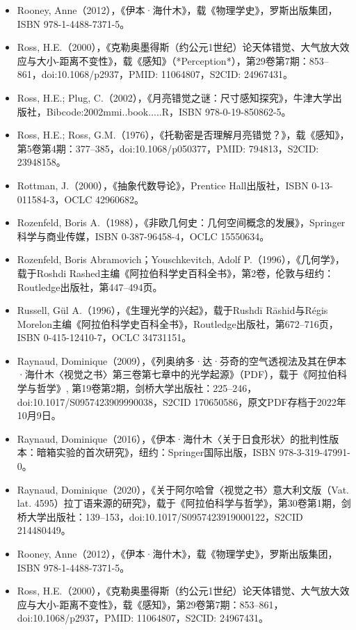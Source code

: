 \begin{itemize}
\item Rooney, Anne（2012），《伊本·海什木》，载《物理学史》，罗斯出版集团，ISBN 978-1-4488-7371-5。
\item Ross, H.E.（2000），《克勒奥墨得斯（约公元1世纪）论天体错觉、大气放大效应与大小-距离不变性》，载《感知》（*Perception*），第29卷第7期：853–861，doi:10.1068/p2937，PMID: 11064807，S2CID: 24967431。
\item Ross, H.E.; Plug, C.（2002），《月亮错觉之谜：尺寸感知探究》，牛津大学出版社，Bibcode:2002mmi..book.....R，ISBN 978-0-19-850862-5。
\item Ross, H.E.; Ross, G.M.（1976），《托勒密是否理解月亮错觉？》，载《感知》，第5卷第4期：377–385，doi:10.1068/p050377，PMID: 794813，S2CID: 23948158。
\item Rottman, J.（2000），《抽象代数导论》，Prentice Hall出版社，ISBN 0-13-011584-3，OCLC 42960682。
\item Rozenfeld, Boris A.（1988），《非欧几何史：几何空间概念的发展》，Springer科学与商业传媒，ISBN 0-387-96458-4，OCLC 15550634。
\item Rozenfeld, Boris Abramovich；Youschkevitch, Adolf P.（1996），《几何学》，载于Roshdi Rashed主编《阿拉伯科学史百科全书》，第2卷，伦敦与纽约：Routledge出版社，第447–494页。
\item Russell, Gül A.（1996），《生理光学的兴起》，载于Rushdī Rāshid与Régis Morelon主编《阿拉伯科学史百科全书》，Routledge出版社，第672–716页，ISBN 0-415-12410-7，OCLC 34731151。
\item Raynaud, Dominique（2009），《列奥纳多·达·芬奇的空气透视法及其在伊本·海什木〈视觉之书〉第三卷第七章中的光学起源》（PDF），载于《阿拉伯科学与哲学》, 第19卷第2期，剑桥大学出版社：225–246，doi:10.1017/S0957423909990038，S2CID 170650586，原文PDF存档于2022年10月9日。
\item Raynaud, Dominique（2016），《伊本·海什木〈关于日食形状〉的批判性版本：暗箱实验的首次研究》，纽约：Springer国际出版，ISBN 978-3-319-47991-0。
\item Raynaud, Dominique（2020），《关于阿尔哈曾〈视觉之书〉意大利文版（Vat. lat. 4595）拉丁语来源的研究》，载于《阿拉伯科学与哲学》，第30卷第1期，剑桥大学出版社：139–153，doi:10.1017/S0957423919000122，S2CID 214480449。
\item Rooney, Anne（2012），《伊本·海什木》，载《物理学史》，罗斯出版集团，ISBN 978-1-4488-7371-5。
\item Ross, H.E.（2000），《克勒奥墨得斯（约公元1世纪）论天体错觉、大气放大效应与大小-距离不变性》，载《感知》，第29卷第7期：853–861，doi:10.1068/p2937，PMID: 11064807，S2CID: 24967431。

\end{itemize}
